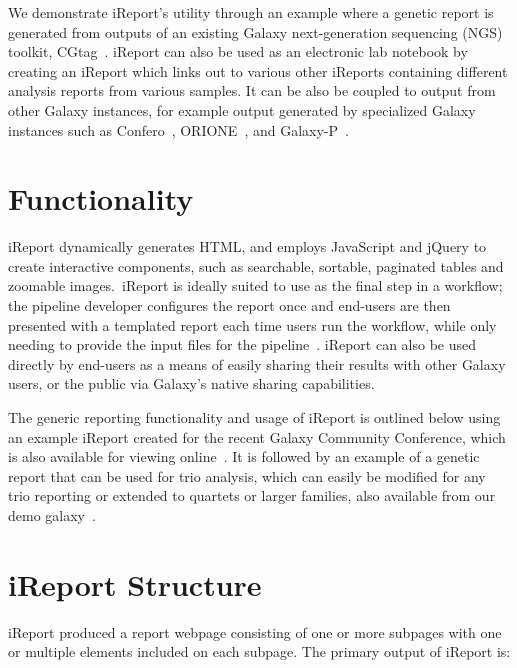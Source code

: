 We demonstrate iReport’s utility through an example where a genetic report is generated from outputs of an existing Galaxy next-generation sequencing (NGS) toolkit, CGtag~\cite{cgtag}. iReport can also be used as an electronic lab notebook by creating an iReport which links out to various other iReports containing different analysis reports from various samples. It can be also be coupled to output from other Galaxy instances, for example output generated by specialized Galaxy instances such as Confero~\cite{confero}, ORIONE~\cite{orione}, and Galaxy-P~\cite{url-galaxyp}.

\section*{Functionality}
iReport dynamically generates HTML, and employs JavaScript and jQuery to create interactive components, such as searchable, sortable, paginated tables and zoomable images.\ iReport is ideally suited to use as the final step in a workflow; the pipeline developer configures the report once and end-users are then presented with a templated report each time users run the workflow, while only needing to provide the input files for the pipeline~\cite{CGtagpipeline}. iReport can also be used directly by end-users as a means of easily sharing their results with other Galaxy users, or the public via Galaxy's native sharing capabilities.

The generic reporting functionality and usage of iReport is outlined below using an example iReport created for the recent Galaxy Community Conference, which is also available for viewing online~\cite{url-ireport-tutorial}. It is followed by an example of a genetic report that can be used for trio analysis, which can easily be modified for any trio reporting or extended to quartets or larger families, also available from our demo galaxy~\cite{url-genetic-ireport}.

\section*{iReport Structure}

iReport produced a report webpage consisting of one or more subpages with one or multiple elements included on each subpage. The primary output of iReport is:


